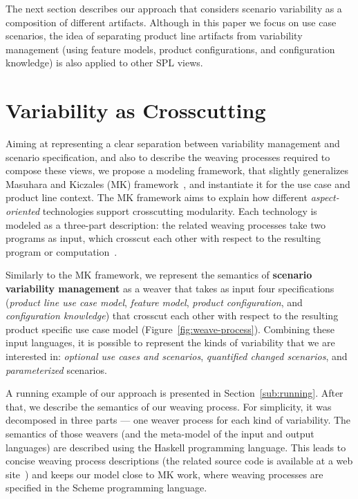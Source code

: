 \documentclass{report}
\begin{document}
\begin{frontmatter}
The next section describes our approach that considers scenario variability as a
composition of different artifacts. Although in this paper we focus on use case
scenarios, the idea of separating product line artifacts from variability
management (using feature models, product configurations, and configuration
knowledge) is also applied to other SPL views.


\section{Variability as Crosscutting}
\label{sec:models}

Aiming at representing a clear separation between variability management and
scenario specification, and also to describe the weaving processes required to
compose these views, we propose a modeling framework, that slightly generalizes
Masuhara and Kiczales (MK) framework~\cite{kiczales-ecoop-2003}, and instantiate
it for the use case and product line context. The MK framework aims to explain
how different \emph{aspect-oriented} technologies support crosscutting
modularity. Each technology is modeled as a three-part description: the related
weaving processes take two programs as input, which crosscut each other with
respect to the resulting program or computation~\cite{kiczales-ecoop-2003}.

Similarly to the MK framework, we represent the semantics of \textbf{scenario
variability management} as a weaver that takes as input four specifications
(\emph{product line use case model}, \emph{feature model}, \emph{product
configuration}, and \emph{configuration knowledge}) that crosscut each other with
respect to the resulting product specific use case model
(Figure~\ref{fig:weave-process}). Combining these input languages, it is possible
to represent the kinds of variability that we are interested in: \emph{optional
use cases and scenarios}, \emph{quantified changed scenarios}, and
\emph{parameterized} scenarios.

A running example of our approach is presented in Section~\ref{sub:running}.
After that, we describe the semantics of our weaving process. For simplicity, it
was decomposed in three parts --- one weaver process for each kind of
variability.  The semantics of those weavers (and the meta-model of the input and
output languages) are described using the Haskell programming
language. This leads to concise weaving process
descriptions (the related source code is available at a web site~\cite{spg-url})
and keeps our model close to MK work, where weaving processes are specified in
the Scheme programming language. 


\end{frontmatter}
\end{document}
